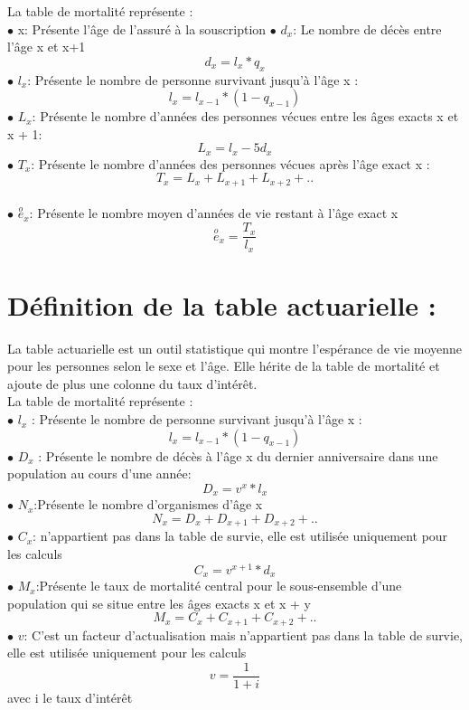 \documentclass[french]{report}
\begin{document}
\newline La table de mortalité représente : 
\\
 \newline$\bullet$ x: Présente l'âge de l'assuré à la souscription  
\newline  
\newline $\bullet$ $d_{x}$: Le nombre de décès entre l'âge x et x+1  \[d_{x} =l_{x}*q_{x}\]
\newline $\bullet$ $l_{x} $: Présente le nombre de personne survivant jusqu'à l'âge x :
\[l_{x} = l_{x-1}*(1-q_{x-1})\]
\newline$\bullet$ $L_{x}$: Présente le nombre d'années des personnes vécues entre les âges exacts  x et x + 1:  \[L_{x}=l_{x}-5d_{x}\]
\newline$\bullet$ $T_{x}$: Présente le nombre d'années des personnes vécues après l'âge exact x :  \[T_{x}=L_{x}+L_{x+1}+L_{x+2}+..\]
\\$\bullet$ $\overset{o}e_{x}$: Présente le nombre moyen d'années de vie restant à l'âge exact x
\\
\[\overset{o}e_{x} = \frac{T_{x}}{l_{x}}\]

\section {Définition de la table actuarielle  :}
La table actuarielle est un outil statistique qui montre l'espérance de vie moyenne pour les personnes selon le sexe et l'âge. Elle hérite de la table de mortalité et ajoute de plus une colonne du taux d'intérêt.
\\
\newline La table de mortalité représente : 
\\
\newline $\bullet$ $l_{x} $ : Présente le nombre de personne survivant jusqu'à l'âge x :
\[l_{x} = l_{x-1}*(1-q_{x-1})\]
\newline 
 \newline$\bullet$ $D_{x}$ : Présente le nombre de décès à l'âge x du dernier anniversaire dans une population au cours d'une année: \[ D_{x}=v^{x}*l_{x}\]
 \newline 
\newline$\bullet$ $N_{x}$:Présente le nombre d'organismes d'âge x \[ N_{x}=D_{x}+D_{x+1}+D_{x+2}+..\]
 \newline 
\newline$\bullet$ $C_{x}$: n'appartient pas dans la table de survie, elle est utilisée  uniquement pour les calculs 
 \[ C_{x}=v^{x+1}*d_{x}\]
 \newline 
 \newline$\bullet$ $M_{x}$:Présente le taux de mortalité central pour le sous-ensemble d'une population qui se situe entre les âges exacts x et x + y \[ M_{x}=C_{x}+C_{x+1}+C_{x+2}+..\]
 \newline 
  \newline$\bullet$ $v$: C'est un facteur d'actualisation mais n'appartient pas dans la table de survie, elle est utilisée  uniquement pour les calculs 
\[ v = \frac{1}{1+i}\]
avec i le taux d'intérêt 
\newline 
\end{document}
